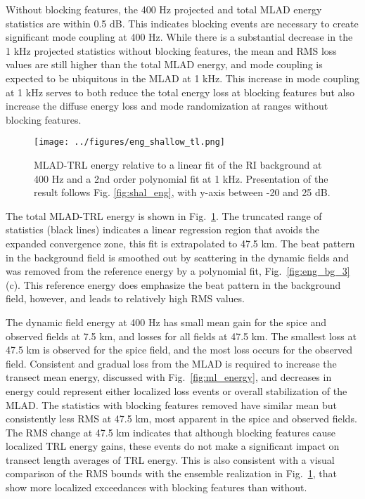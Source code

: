 \documentclass[preprint,NumberedRefs]{JASA}
\begin{document}
Without blocking features, the 400 Hz projected and total MLAD energy statistics are within 0.5 dB. This indicates blocking events are necessary to create significant mode coupling at 400 Hz. While there is a substantial decrease in the 1 kHz projected statistics without blocking features, the mean and RMS loss values are still higher than the total MLAD energy, and mode coupling is expected to be ubiquitous in the MLAD at 1 kHz. This increase in mode coupling at 1 kHz serves to both reduce the total energy loss at blocking features but also increase the diffuse energy loss and mode randomization at ranges without blocking features.

\begin{figure}
\texttt{[image: ../figures/eng\_shallow\_tl.png]}
        \caption{MLAD-TRL energy relative to a linear fit of the RI background at 400 Hz and a 2nd order polynomial fit at 1 kHz. Presentation of the result follows Fig. \ref{fig:shal_eng}, with y-axis between -20 and 25 dB.}
    \label{fig:eng_tl}
\end{figure}
The total MLAD-TRL energy is shown in Fig.~\ref{fig:eng_tl}. The truncated range of statistics (black lines) indicates a linear regression region that avoids the expanded convergence zone, this fit is extrapolated to 47.5 km. The beat pattern in the background field is smoothed out by scattering in the dynamic fields and was removed from the reference energy by a polynomial fit, Fig.~\ref{fig:eng_bg_3}(c). This reference energy does emphasize the beat pattern in the background field, however, and leads to relatively high RMS values.

The dynamic field energy at 400 Hz has small mean gain for the spice and observed fields at 7.5 km, and losses for all fields at 47.5 km. The smallest loss at 47.5 km is observed for the spice field, and the most loss occurs for the observed field. Consistent and gradual loss from the MLAD is required to increase the transect mean energy, discussed with Fig.~\ref{fig:ml_energy}, and decreases in energy could represent either localized loss events or overall stabilization of the MLAD. The statistics with blocking features removed have similar mean but consistently less RMS at 47.5 km, most apparent in the spice and observed fields. The RMS change at 47.5 km indicates that although blocking features cause localized TRL energy gains, these events do not make a significant impact on transect length averages of TRL energy. This is also consistent with a visual comparison of the RMS bounds with the ensemble realization in Fig.~\ref{fig:eng_tl}, that show more localized exceedances with blocking features than without.
\end{document}
